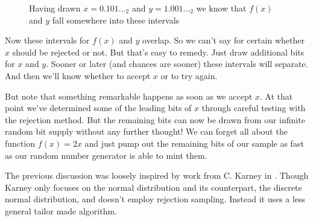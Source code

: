 \begin{figure}[h]
    \centering
    \caption{Having drawn $x = 0.101..._2$ and $y = 1.001..._2$ we know that $f(x)$ and $y$ fall somewhere into these intervals}
    \label{fig:rejection_1}
\end{figure}

Now these intervals for $f(x)$ and $y$ overlap. So we can't say for certain whether $x$ should be rejected or not. But that's easy to remedy. Just draw additional bits for $x$ and $y$. Sooner or later (and chances are sooner) these intervals will separate. And then we'll know whether to accept $x$ or to try again.

But note that something remarkable happens as soon as we accept $x$. At that point we've determined some of the leading bits of $x$ through careful testing with the rejection method. But the remaining bits can now be drawn from our infinite random bit supply without any further thought! We can forget all about the function $f(x)=2x$ and just pump out the remaining bits of our sample as fast as our random number generator is able to mint them.\\\noindent

The previous discussion was loosely inspired by work from C. Karney in \cite{Karney}. Though Karney only focuses on the normal distribution and its counterpart, the discrete normal distribution, and doesn't employ rejection sampling. Instead it uses a less general tailor made algorithm.
